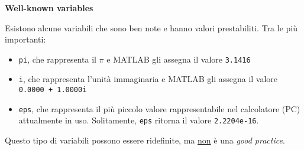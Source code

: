 \begin{flushleft}
    \large
    \hypertarget{
        lab: Well-known variables
    }{
        \textcolor{Red3}{\textbf{Well-known variables}}
    }
    \label{lab: Well-known variables}
\end{flushleft}
Esistono alcune variabili che sono ben note e hanno valori prestabiliti. Tra le più importanti:
\begin{itemize}
    \item \texttt{pi}, che rappresenta il $\pi$ e MATLAB gli assegna il valore \texttt{3.1416}
    
    \item \texttt{i}, che rappresenta l'unità immaginaria e MATLAB gli assegna il valore \texttt{0.0000 + 1.0000i}
    
    \item \texttt{eps}, che rappresenta il più piccolo valore rappresentabile nel calcolatore (PC) attualmente in uso. Solitamente, \texttt{eps} ritorna il valore \texttt{2.2204e-16}.
\end{itemize}
Questo tipo di variabili possono essere ridefinite, ma \underline{non} è una \emph{good practice}.

\newpage

